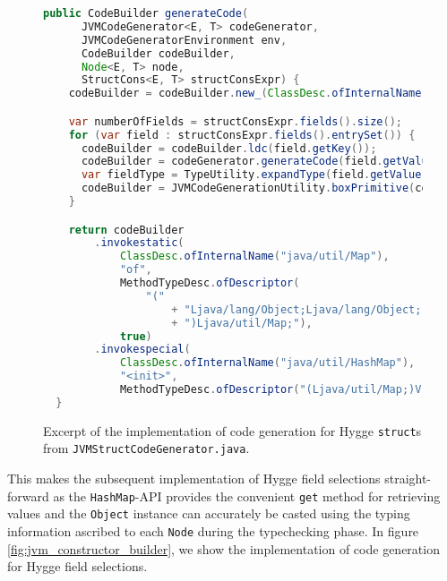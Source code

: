 \begin{figure}[H]
  \centering
  \begin{lstlisting}[language=Java]
  public CodeBuilder generateCode(
      JVMCodeGenerator<E, T> codeGenerator,
      JVMCodeGeneratorEnvironment env,
      CodeBuilder codeBuilder,
      Node<E, T> node,
      StructCons<E, T> structConsExpr) {
    codeBuilder = codeBuilder.new_(ClassDesc.ofInternalName("java/util/HashMap")).dup();

    var numberOfFields = structConsExpr.fields().size();
    for (var field : structConsExpr.fields().entrySet()) {
      codeBuilder = codeBuilder.ldc(field.getKey());
      codeBuilder = codeGenerator.generateCode(field.getValue(), env, codeBuilder);
      var fieldType = TypeUtility.expandType(field.getValue().env(), field.getValue().type());
      codeBuilder = JVMCodeGenerationUtility.boxPrimitive(codeBuilder, fieldType);
    }

    return codeBuilder
        .invokestatic(
            ClassDesc.ofInternalName("java/util/Map"),
            "of",
            MethodTypeDesc.ofDescriptor(
                "("
                    + "Ljava/lang/Object;Ljava/lang/Object;".repeat(numberOfFields)
                    + ")Ljava/util/Map;"),
            true)
        .invokespecial(
            ClassDesc.ofInternalName("java/util/HashMap"),
            "<init>",
            MethodTypeDesc.ofDescriptor("(Ljava/util/Map;)V"));
  }
  \end{lstlisting}
  \caption{Excerpt of the implementation of code generation for Hygge \texttt{struct}s from \texttt{JVMStructCodeGenerator.java}.}
  \label{fig:jvm_struct_builder}
\end{figure}

This makes the subsequent implementation of Hygge field selections straight-forward as the \texttt{HashMap}-API
provides the convenient \texttt{get} method for retrieving values and the \texttt{Object} instance can accurately be
casted using the typing information ascribed to each \texttt{Node} during the typechecking phase.
In figure \ref{fig:jvm_constructor_builder}, we show the implementation of code generation for Hygge field selections.

